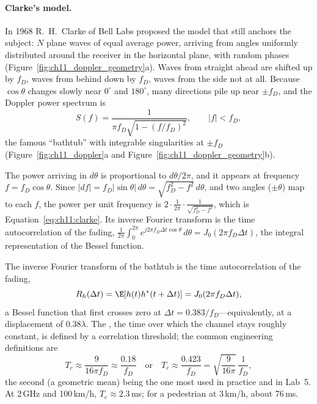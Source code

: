 
\paragraph{Clarke's model.} In 1968 R.~H.~Clarke of Bell Labs proposed the model that still
anchors the subject: $N$ plane waves of equal average power, arriving from angles uniformly
distributed around the receiver in the horizontal plane, with random phases
(Figure~\ref{fig:ch11_doppler_geometry}a). Waves from straight ahead are shifted up by $f_D$, waves
from behind down by $f_D$, waves from the side not at all. Because $\cos\theta$ changes slowly near
$0^\circ$ and $180^\circ$, many directions pile up near $\pm f_D$, and the Doppler power spectrum is
\begin{equation}
S(f)=\frac{1}{\pi f_D\sqrt{1-(f/f_D)^2}},\qquad |f|<f_D ,
\label{eq:ch11:clarke}
\end{equation}
the famous ``bathtub'' with integrable singularities at $\pm f_D$ (Figure~\ref{fig:ch11_doppler}a and
Figure~\ref{fig:ch11_doppler_geometry}b).



\begin{deeper}
The power arriving in $d\theta$ is proportional to $d\theta/2\pi$, and it appears at frequency
$f=f_D\cos\theta$. Since $|df|=f_D|\sin\theta|\,d\theta=\sqrt{f_D^2-f^2}\,d\theta$, and two angles
($\pm\theta$) map to each $f$, the power per unit frequency is $2\cdot\frac{1}{2\pi}\cdot
\frac{1}{\sqrt{f_D^2-f^2}}$, which is Equation~\eqref{eq:ch11:clarke}. Its inverse Fourier transform
is the time autocorrelation of the fading, $\frac{1}{2\pi}\int_0^{2\pi}e^{j2\pi f_D\Delta t\cos\theta}\,d\theta
=J_0(2\pi f_D\Delta t)$, the integral representation of the Bessel function.
\end{deeper}

The inverse Fourier transform of the bathtub is the time autocorrelation of the fading,
\begin{equation}
R_h(\Delta t)=\E[h(t)h^*(t+\Delta t)]=J_0(2\pi f_D\Delta t),
\label{eq:ch11:j0}
\end{equation}
a Bessel function that first crosses zero at $\Delta t=0.383/f_D$---equivalently, at a displacement
of $0.38\lambda$. The , the time over which the channel stays roughly constant,
is defined by a correlation threshold; the common engineering definitions are
\begin{equation}
T_c\approx\frac{9}{16\pi f_D}\approx\frac{0.18}{f_D}\quad\text{or}\quad
T_c\approx\frac{0.423}{f_D}=\sqrt{\frac{9}{16\pi}}\,\frac{1}{f_D},
\end{equation}
the second (a geometric mean) being the one most used in practice and in Lab~5. At 2\,GHz and
100\,km/h, $T_c\approx2.3$\,ms; for a pedestrian at 3\,km/h, about 76\,ms.

